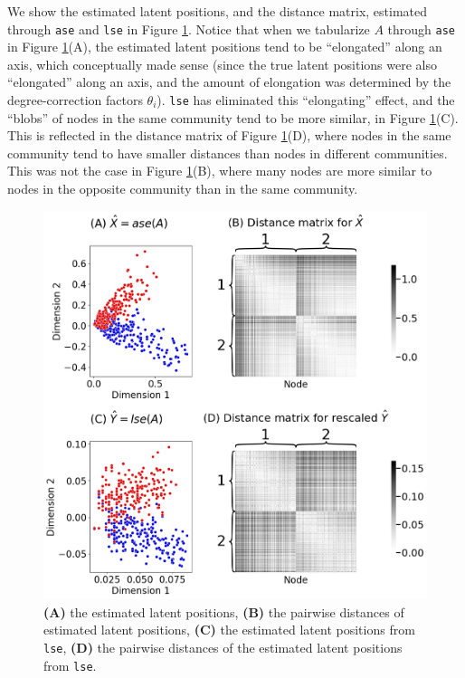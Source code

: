 We show the estimated latent positions, and the distance matrix, estimated through \texttt{ase} and \texttt{lse} in Figure \ref{fig:ch6:lse:dcsbm_lse}. Notice that when we tabularize $A$ through \texttt{ase} in Figure \ref{fig:ch6:lse:dcsbm_lse}(A), the estimated latent positions tend to be ``elongated'' along an axis, which conceptually made sense (since the true latent positions were also ``elongated'' along an axis, and the amount of elongation was determined by the degree-correction factors $\theta_i$). \texttt{lse} has eliminated this ``elongating'' effect, and the ``blobs'' of nodes in the same community tend to be more similar, in Figure \ref{fig:ch6:lse:dcsbm_lse}(C). This is reflected in the distance matrix of Figure \ref{fig:ch6:lse:dcsbm_lse}(D), where nodes in the same community tend to have smaller distances than nodes in different communities. This was not the case in Figure \ref{fig:ch6:lse:dcsbm_lse}(B), where many nodes are more similar to nodes in the opposite community than in the same community.

\begin{figure}[h]
    \centering
    \includegraphics[width=\linewidth]{representations/ch6/Images/dcsbm_lse.png}
    \caption[LSE vs ASE, heavy-tailed example]{\textbf{(A)} the estimated latent positions, \textbf{(B)} the pairwise distances of estimated latent positions, \textbf{(C)} the estimated latent positions from \texttt{lse}, \textbf{(D)} the pairwise distances of the estimated latent positions from \texttt{lse}.}
    \label{fig:ch6:lse:dcsbm_lse}
\end{figure}

